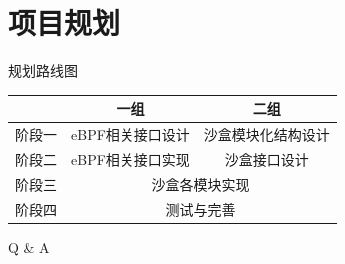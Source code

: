\documentclass[UTF8,fontset=macnew,xcolor=table]{ctexbeamer}
\begin{document}
\section{项目规划}

\begin{frame}{规划路线图}
\begin{table}[H]
    \begin{tabular}{|c|c|c|}
    \hline 
     & \textbf{一组}     &  \textbf{二组} \\\hline
    阶段一 & eBPF相关接口设计 & 沙盒模块化结构设计 \\\hline
    阶段二 & eBPF相关接口实现 & 沙盒接口设计   \\\hline
    阶段三 & \multicolumn{2}{c|}{沙盒各模块实现}  \\\hline
    阶段四 & \multicolumn{2}{c|}{测试与完善}  \\\hline
    \end{tabular}
\end{table}

\end{frame}

\begin{frame}
    \centering
    \Huge Q \& A
\end{frame}
\end{document}
